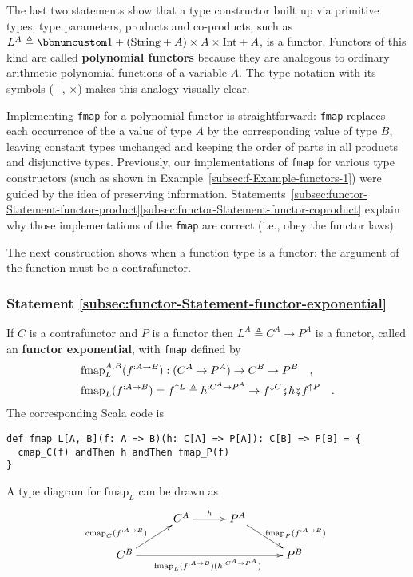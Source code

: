 The last two statements show that a type constructor built up via
primitive types, type parameters, products and co-products, such as
$L^{A}\triangleq\bbnum 1+(\text{String}+A)\times A\times\text{Int}+A$,
is a functor. Functors of this kind are called \textbf{polynomial
functors} because they are analogous to ordinary arithmetic polynomial
functions of a variable $A$. The type notation with its symbols ($+$,
$\times$) makes this analogy visually clear. 

Implementing \lstinline!fmap! for a polynomial functor is straightforward:
\lstinline!fmap! replaces each occurrence of the a value of type
$A$ by the corresponding value of type $B$, leaving constant types
unchanged and keeping the order of parts in all products and disjunctive
types. Previously, our implementations of \lstinline!fmap! for various
type constructors (such as shown in Example~\ref{subsec:f-Example-functors-1})
were guided by the idea of preserving information. Statements~\ref{subsec:functor-Statement-functor-product}\textendash \ref{subsec:functor-Statement-functor-coproduct}
explain why those implementations of the \lstinline!fmap! are correct
(i.e., obey the functor laws).

The next construction shows when a function type is a functor: the
argument of the function must be a contrafunctor.

\subsubsection{Statement \label{subsec:functor-Statement-functor-exponential}\ref{subsec:functor-Statement-functor-exponential}}

If $C$ is a contrafunctor and $P$ is a functor then $L^{A}\triangleq C^{A}\rightarrow P^{A}$
is a functor, called an \textbf{functor
exponential}, with \lstinline!fmap! defined by
\begin{align}
 & \text{fmap}_{L}^{A,B}(f^{:A\rightarrow B}):(C^{A}\rightarrow P^{A})\rightarrow C^{B}\rightarrow P^{B}\quad,\nonumber \\
 & \text{fmap}_{L}(f^{:A\rightarrow B})=f^{\uparrow L}\triangleq h^{:C^{A}\rightarrow P^{A}}\rightarrow f^{\downarrow C}\bef h\bef f^{\uparrow P}\quad.\label{eq:f-functor-exponential-def-of-fmap}
\end{align}
The corresponding Scala code is
\begin{lstlisting}
def fmap_L[A, B](f: A => B)(h: C[A] => P[A]): C[B] => P[B] = {
  cmap_C(f) andThen h andThen fmap_P(f)
}
\end{lstlisting}
A type diagram for $\text{fmap}_{L}$ can be drawn as
\[
\xymatrix{\xyScaleY{1.5pc}\xyScaleX{2.5pc} & C^{A}\ar[r]\sp(0.5){h} & P^{A}\ar[rd]\sp(0.6){\ \text{fmap}_{P}(f^{:A\rightarrow B})\ }\\
C^{B}\ar[ru]\sp(0.4){\text{cmap}_{C}(f^{:A\rightarrow B})\ ~~}\ar[rrr]\sb(0.5){\text{fmap}_{L}(f^{:A\rightarrow B})(h^{:C^{A}\rightarrow P^{A}})\ } &  &  & P^{B}
}
\]



